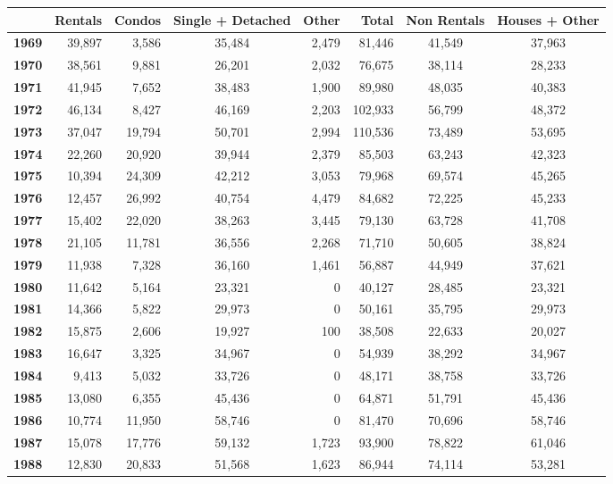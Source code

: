 \def\table{\def\figurename{Table}\figure}
\let\endtable\endfigure 

\begin{table}[h]
\caption{Ontario housing starts by intended market 1969-2016}
{\footnotesize
\begin{tabular}{@{}>{\bfseries}r r r c r r c c@{}}
\toprule
 & Rentals & Condos & Single + Detached & Other & Total & Non Rentals & Houses + Other \\
\midrule
1969 & 39,897 & 3,586 & 35,484 & 2,479 & 81,446 & 41,549 & 37,963 \\
1970 & 38,561 & 9,881 & 26,201 & 2,032 & 76,675 & 38,114 & 28,233 \\
1971 & 41,945 & 7,652 & 38,483 & 1,900 & 89,980 & 48,035 & 40,383 \\
1972 & 46,134 & 8,427 & 46,169 & 2,203 & 102,933 & 56,799 & 48,372 \\
1973 & 37,047 & 19,794 & 50,701 & 2,994 & 110,536 & 73,489 & 53,695 \\
1974 & 22,260 & 20,920 & 39,944 & 2,379 & 85,503 & 63,243 & 42,323 \\
1975 & 10,394 & 24,309 & 42,212 & 3,053 & 79,968 & 69,574 & 45,265 \\
1976 & 12,457 & 26,992 & 40,754 & 4,479 & 84,682 & 72,225 & 45,233 \\
1977 & 15,402 & 22,020 & 38,263 & 3,445 & 79,130 & 63,728 & 41,708 \\
1978 & 21,105 & 11,781 & 36,556 & 2,268 & 71,710 & 50,605 & 38,824 \\
1979 & 11,938 & 7,328 & 36,160 & 1,461 & 56,887 & 44,949 & 37,621 \\
1980 & 11,642 & 5,164 & 23,321 & 0 & 40,127 & 28,485 & 23,321 \\
1981 & 14,366 & 5,822 & 29,973 & 0 & 50,161 & 35,795 & 29,973 \\
1982 & 15,875 & 2,606 & 19,927 & 100 & 38,508 & 22,633 & 20,027 \\
1983 & 16,647 & 3,325 & 34,967 & 0 & 54,939 & 38,292 & 34,967 \\
1984 & 9,413 & 5,032 & 33,726 & 0 & 48,171 & 38,758 & 33,726 \\
1985 & 13,080 & 6,355 & 45,436 & 0 & 64,871 & 51,791 & 45,436 \\
1986 & 10,774 & 11,950 & 58,746 & 0 & 81,470 & 70,696 & 58,746 \\
1987 & 15,078 & 17,776 & 59,132 & 1,723 & 93,900 & 78,822 & 61,046 \\
1988 & 12,830 & 20,833 & 51,568 & 1,623 & 86,944 & 74,114 & 53,281 \\

\end{tabular}}
\end{table}

